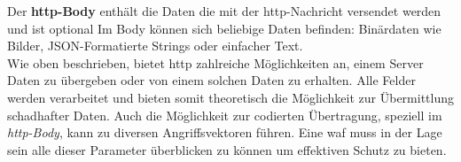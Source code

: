 Der \textbf{\ac{http}-Body} enthält die Daten die mit der \ac{http}-Nachricht versendet werden und ist optional
Im Body können sich beliebige Daten befinden: Binärdaten wie Bilder, JSON-Formatierte Strings oder einfacher Text\cite{HTTPMessagesHTTP2024}.\\

Wie oben beschrieben, bietet \ac{http} zahlreiche Möglichkeiten an, einem Server Daten zu übergeben oder von einem solchen Daten zu erhalten.
Alle Felder werden verarbeitet und bieten somit theoretisch die Möglichkeit zur Übermittlung schadhafter Daten.
Auch die Möglichkeit zur codierten Übertragung, speziell im \textit{\ac{http}-Body}, kann zu diversen Angriffsvektoren führen.
Eine \ac{waf} muss in der Lage sein alle dieser Parameter überblicken zu können um effektiven Schutz zu bieten.

\pagebreak    